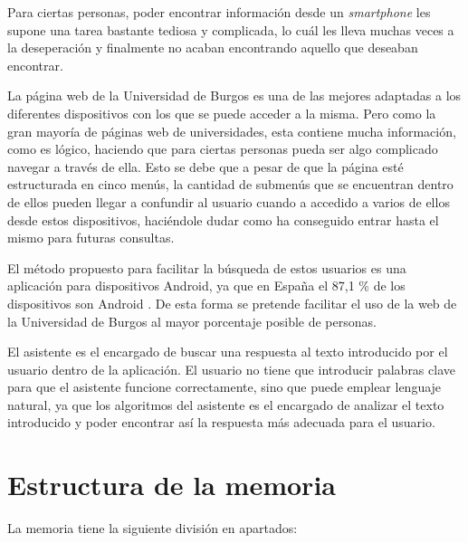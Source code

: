 
Para ciertas personas, poder encontrar información desde un \textit{smartphone} les supone una tarea bastante tediosa y complicada, lo cuál les lleva muchas veces a la deseperación y finalmente no acaban encontrando aquello que deseaban encontrar.

La página web de la Universidad de Burgos es una de las mejores adaptadas a los diferentes dispositivos con los que se puede acceder a la misma. Pero como la gran mayoría de páginas web de universidades, esta contiene mucha información, como es lógico, haciendo que para ciertas personas pueda ser algo complicado navegar a través de ella. Esto se debe que a pesar de que la página esté estructurada en cinco menús, la cantidad de submenús que se encuentran dentro de ellos pueden llegar a confundir al usuario cuando a accedido a varios de ellos desde estos dispositivos, haciéndole dudar como ha conseguido entrar hasta el mismo para futuras consultas.

El método propuesto para facilitar la búsqueda de estos usuarios es una aplicación para dispositivos Android, ya que en España el 87,1 \% de los dispositivos son Android \cite{android:data}. De esta forma se pretende facilitar el uso de la web de la Universidad de Burgos al mayor porcentaje posible de personas.

El asistente es el encargado de buscar una respuesta al texto introducido por el usuario dentro de la aplicación. El usuario no tiene que introducir palabras clave para que el asistente funcione correctamente, sino que puede emplear lenguaje natural, ya que los algoritmos del asistente es el encargado de analizar el texto introducido y poder encontrar así la respuesta más adecuada para el usuario.

\section{Estructura de la memoria}\label{estructura-de-la-memoria}
La memoria tiene la siguiente división en apartados:

